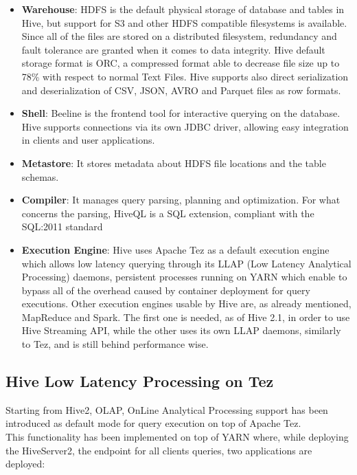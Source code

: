 \begin{itemize}
    \item \textbf{Warehouse}: HDFS is the default physical storage of database and tables in Hive, but support for S3 and other HDFS compatible filesystems is available. Since all of the files are stored on a distributed filesystem, redundancy and fault tolerance are granted when it comes to data integrity. Hive default storage format is ORC, a compressed format able to decrease file size up to 78\% with respect to normal Text Files. Hive supports also direct serialization and deserialization of CSV, JSON, AVRO and Parquet files as row formats.
    \item \textbf{Shell}: Beeline is the frontend tool for interactive querying on the database. Hive supports connections via its own JDBC driver, allowing easy integration in clients and user applications.
    \item \textbf{Metastore}: It stores metadata about HDFS file locations and the table schemas.
    \item \textbf{Compiler}: It manages query parsing, planning and optimization. For what concerns the parsing, HiveQL is a SQL extension, compliant with the SQL:2011 standard
    \item \textbf{Execution Engine}: Hive uses Apache Tez as a default execution engine  which allows low latency querying through its LLAP (Low Latency Analytical Processing) daemons, persistent processes running on YARN which enable to bypass all of the overhead caused by container deployment for query executions. Other execution engines usable by Hive are, as already mentioned, MapReduce and Spark. The first one is needed, as of Hive 2.1, in order to use Hive Streaming API, while the other uses its own LLAP daemons, similarly to Tez, and is still behind performance wise.
\end{itemize}

\subsection{Hive Low Latency Processing on Tez}

Starting from Hive2, OLAP, OnLine Analytical Processing support has been introduced as default mode for query execution on top of Apache Tez.\\  
This functionality has been implemented on top of YARN where, while deploying the HiveServer2, the endpoint for all clients queries, two applications are deployed: 


